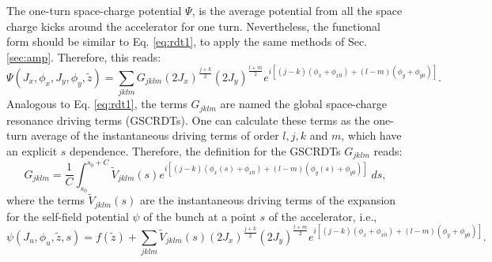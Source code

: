 The one-turn space-charge potential $\Psi$, is the average potential from all the space charge kicks around the accelerator for one turn. Nevertheless, the functional form should be similar to Eq. \ref{eq:rdt1}, to apply the same methods of Sec. \ref{sec:amp}. Therefore, this reads:
\begin{equation}
    \label{eq:scpot1}
    \Psi(J_x,\phi_x,J_y, \phi_y,\tilde{z})= \sum_{jklm} G_{jklm} \left( 2 J_x\right)^{\frac{j+k}{2}} \left( 2 J_y\right)^{\frac{l+m}{2}} e^{i\left[ \left( j-k \right)\left( \phi_x+\phi_{x0} \right)+ \left( l-m \right) \left( \phi_y+\phi_{y0} \right)\right]}.
\end{equation}
Analogous to Eq. \ref{eq:rdt1}, the terms $G_{jklm}$ are named the global space-charge resonance driving terms (GSCRDTs). One can calculate these terms as the one-turn average of the instantaneous driving terms of order $l,j,k$ and $m$, which have an explicit $s$ dependence. Therefore, the definition for the GSCRDTs $G_{jklm}$ reads:
\begin{equation}
    \label{eq:gscrdts}
    G_{jklm}= \frac{1}{C}\int_{s_0}^{s_0+C} \tilde{V}_{jklm}(s) e^{i\left[ \left( j-k \right)\left( \phi_x(s)+\phi_{x0} \right)+ \left( l-m \right) \left( \phi_y(s)+\phi_{y0} \right)\right]} \; ds,
\end{equation}
where the terms $\tilde{V}_{jklm}(s)$ are the instantaneous driving terms of the expansion for the self-field potential $\psi$ of the bunch at a point $s$ of the accelerator, i.e.,
\begin{equation}
    \label{eq:scpot2}
    \psi(J_u,\phi_u,\tilde{z},s)= f(\tilde{z}) + \sum_{jklm} \tilde{V}_{jklm}(s) \left( 2 J_x\right)^{\frac{j+k}{2}} \left( 2 J_y\right)^{\frac{l+m}{2}} e^{i\left[ \left( j-k \right)\left( \phi_x+\phi_{x0} \right)+ \left( l-m \right) \left( \phi_y+\phi_{y0} \right)\right]}.
\end{equation} 

